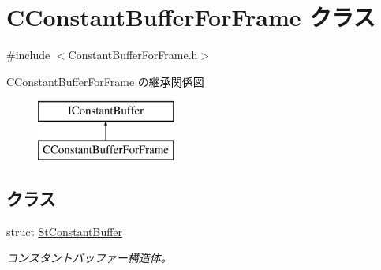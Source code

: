 \hypertarget{class_c_constant_buffer_for_frame}{}\section{C\+Constant\+Buffer\+For\+Frame クラス}
\label{class_c_constant_buffer_for_frame}


{\ttfamily \#include $<$Constant\+Buffer\+For\+Frame.\+h$>$}

C\+Constant\+Buffer\+For\+Frame の継承関係図\begin{figure}[H]
\begin{center}
\leavevmode
\includegraphics[height=2.000000cm]{class_c_constant_buffer_for_frame}
\end{center}
\end{figure}
\subsection*{クラス}
\begin{DoxyCompactItemize}
\item 
struct \hyperlink{struct_c_constant_buffer_for_frame_1_1_st_constant_buffer}{St\+Constant\+Buffer}
\begin{DoxyCompactList}\small\item\em コンスタントバッファー構造体。 \end{DoxyCompactList}\end{DoxyCompactItemize}
